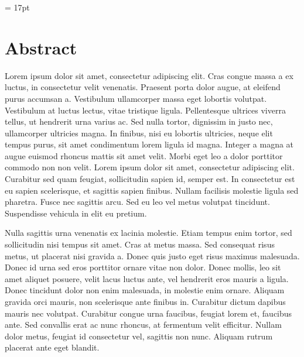 \documentclass[11pt,oneside,openright]{book}
\begin{document}
\baselineskip = 17pt
\begin{titlepage}

\newpage
\thispagestyle{empty}
\end{titlepage}

\frontmatter

\tableofcontents
{}

\chapter{Abstract}

Lorem ipsum dolor sit amet, consectetur adipiscing elit. Cras congue massa a ex luctus, in consectetur velit venenatis. Praesent porta dolor augue, at eleifend purus accumsan a. Vestibulum ullamcorper massa eget lobortis volutpat. Vestibulum at luctus lectus, vitae tristique ligula. Pellentesque ultrices viverra tellus, ut hendrerit urna varius ac. Sed nulla tortor, dignissim in justo nec, ullamcorper ultricies magna. In finibus, nisi eu lobortis ultricies, neque elit tempus purus, sit amet condimentum lorem ligula id magna. Integer a magna at augue euismod rhoncus mattis sit amet velit. Morbi eget leo a dolor porttitor commodo non non velit. Lorem ipsum dolor sit amet, consectetur adipiscing elit. Curabitur sed quam feugiat, sollicitudin sapien id, semper est. In consectetur est eu sapien scelerisque, et sagittis sapien finibus. Nullam facilisis molestie ligula sed pharetra. Fusce nec sagittis arcu. Sed eu leo vel metus volutpat tincidunt. Suspendisse vehicula in elit eu pretium.

Nulla sagittis urna venenatis ex lacinia molestie. Etiam tempus enim tortor, sed sollicitudin nisi tempus sit amet. Cras at metus massa. Sed consequat risus metus, ut placerat nisi gravida a. Donec quis justo eget risus maximus malesuada. Donec id urna sed eros porttitor ornare vitae non dolor. Donec mollis, leo sit amet aliquet posuere, velit lacus luctus ante, vel hendrerit eros mauris a ligula. Donec tincidunt dolor non enim malesuada, in molestie enim ornare. Aliquam gravida orci mauris, non scelerisque ante finibus in. Curabitur dictum dapibus mauris nec volutpat. Curabitur congue urna faucibus, feugiat lorem et, faucibus ante. Sed convallis erat ac nunc rhoncus, at fermentum velit efficitur. Nullam dolor metus, feugiat id consectetur vel, sagittis non nunc. Aliquam rutrum placerat ante eget blandit.
\end{document}
